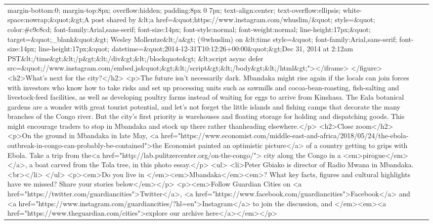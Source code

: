 \documentclass[]{article}
\begin{document}
\begin{table}[!h]
{\begin{tabular}[t]{ll}
margin-bottom:0; margin-top:8px; overflow:hidden; padding:8px 0 7px; text-align:center; text-overflow:ellipsis; white-space:nowrap;\&quot;\&gt;A post shared by \&lt;a href=\&quot;https://www.instagram.com/whuslim/\&quot; style=\&quot; color:\#c9c8cd; font-family:Arial,sans-serif; font-size:14px; font-style:normal; font-weight:normal; line-height:17px;\&quot; target=\&quot;\_blank\&quot;\&gt; Wesley Mollentze\&lt;/a\&gt; (@whuslim) on \&lt;time style=\&quot; font-family:Arial,sans-serif; font-size:14px; line-height:17px;\&quot; datetime=\&quot;2014-12-31T10:12:26+00:00\&quot;\&gt;Dec 31, 2014 at 2:12am PST\&lt;/time\&gt;\&lt;/p\&gt;\&lt;/div\&gt;\&lt;/blockquote\&gt; \&lt;script async defer src=\&quot;//www.instagram.com/embed.js\&quot;\&gt;\&lt;/script\&gt;\&lt;/body\&gt;\&lt;/html\&gt;"></iframe> </figure>  <h2>What’s next for the city?</h2> <p>The future isn’t necessarily dark. Mbandaka might rise again if the locals can join forces with investors who know how to take risks and set up processing units such as sawmills and cocoa-bean-roasting, fish-salting and livestock-feed facilities, as well as developing poultry farms instead of waiting for eggs to arrive from Kinshasa. The Eala botanical gardens are a wonder with great tourist potential, and let’s not forget the little islands and fishing camps that decorate the many branches of the Congo river. But the city’s first priority is warehouses and floating storage for holding and dispatching goods. This might encourage traders to stop in Mbandaka and stock up there rather thanheading elsewhere.</p> <h2>Close zoom</h2> <p>On the ground in Mbandaka in late May, <a href="https://www.economist.com/middle-east-and-africa/2018/05/24/the-ebola-outbreak-in-congo-can-probably-be-contained">the Economist painted an optimistic picture</a> of a country getting to grips with Ebola. Take a trip from the<a href="http://lab.pulitzercenter.org/on-the-congo/"> city along the Congo in a <em>pirogue</em></a>, a boat carved from the Tola tree, in this photo essay.</p> <ul> <li>Peter Gbiako is director of Radio Mwana in Mbandaka.<br></li> </ul> <p><em>Do you live in </em><em>Mbandaka</em><em>? What key facts, figures and cultural highlights have we missed? Share your stories below</em></p> <p><em>Follow Guardian Cities on <a href="https://twitter.com/guardiancities">Twitter</a>, <a href="https://www.facebook.com/guardiancities">Facebook</a> and <a href="https://www.instagram.com/guardiancities/?hl=en">Instagram</a> to join the discussion, and </em><em><a href="https://www.theguardian.com/cities">explore our archive here</a></em></p>\\

\end{tabular}}
\end{table}
\end{document}
